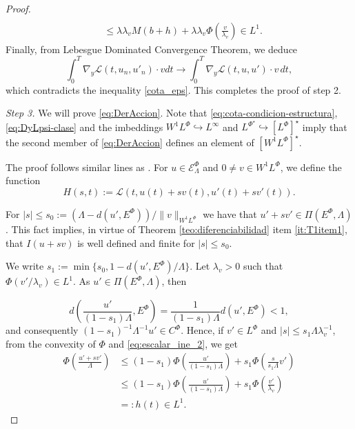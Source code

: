 \documentclass[twoside]{article}
\theoremstyle{remark}
\newcommand{\lphi}{L^{\Phi}}
\newcommand{\lpsi}{L^{\Phi^{\star}}}
\newcommand{\ephi}{E^{\Phi}}
\newcommand{\wphi}{W^{1}\lphi}
\newcommand{\sobnor}{\|_{W^{1}\lphi}}
\newcommand{\domi}{\mathcal{E}^{\Phi}}
\renewcommand{\leq}{\leqslant}
\begin{document}
\begin{proof}
\begin{equation}
\begin{split}
\\
&\leq \lambda\lambda_v M (b+h)+\lambda\lambda_v  \Phi\left(\frac{v}{\lambda_v}\right)\in L^1.
\end{split}
\end{equation}
  Finally, from  Lebesgue Dominated Convergence Theorem, we deduce
\begin{equation}\label{conv_debil}
\int_0^T  \nabla_y\mathcal{L}(t,u_{n},u'_{n})
\cdot  v dt
\to 
\int_0^T \nabla_y\mathcal{L}(t,u,u')\cdot v\, dt, \end{equation}
which contradicts the inequality \eqref{cota_eps}. This completes the proof of step 2.

\emph{Step 3.} We will prove \eqref{eq:DerAccion}. 
 Note that \eqref{eq:cota-condicion-estructura},  \eqref{eq:DyLpsi-clase} and the imbeddings $\wphi \hookrightarrow L^{\infty}$ and  
$\lpsi\hookrightarrow  \left[\lphi\right]^{\star}$ imply that the second member of
\eqref{eq:DerAccion} defines an element of $\left[\wphi\right]^{\star}$.

The proof follows similar lines as \cite[Thm. 1.4]{mawhin2010critical}. 
For $u\in \domi_{\Lambda}$ and $0\neq v\in\wphi$, we define the function
\[H(s,t):=\mathcal{L}(t,u(t)+s v(t),u'(t)+sv'(t)).\]



For  $|s|\leq s_0:=\left(\Lambda-d(u',\ephi)\right)/\|v\sobnor$  we have that  $u'+sv' \in \Pi(\ephi,\Lambda)$. 
This fact implies, in virtue of Theorem \ref{teo:diferenciabilidad} item \ref{it:T1item1}, 
that $I(u+s v)$ is well defined and finite for $|s|\leq s_0$. 



We write $s_1:=\min\{s_0,1-d(u',\ephi)/\Lambda\}$. Let $\lambda_v>0$ such that $\Phi(v'/\lambda_v)\in L^1$. As $u'\in\Pi(\ephi,\Lambda)$, then

\[
d\left(\frac{u'}{(1-s_1)\Lambda},E^{\Phi}\right)=\frac{1}{(1-s_1)\Lambda}d(u', E^{\Phi})<1,
\]
and consequently  $(1-s_1)^{-1}\Lambda^{-1}u'\in C^\Phi$. Hence,  if $v'\in\lphi$ and $|s|\leq s_1 \Lambda\lambda_v^{-1}$, from the convexity of $\Phi$ and \ref{eq:escalar_ine_2}, we get
\begin{equation}\label{eq:cota-u+sv}
\begin{split}
\Phi\left(\frac{u'+sv'}{\Lambda}\right)&
\leq
(1-s_1)\Phi\left(\frac{u'}{(1-s_1)\Lambda}\right)+s_1 \Phi\left(\frac{s}{s_1\Lambda}v'\right)
\\
&\leq
(1-s_1)\Phi\left(\frac{u'}{(1-s_1)\Lambda}\right)+s_1 \Phi\left(\frac{v'}{\lambda_v}\right)\\
&=:h(t) \in L^1.
\end{split}
\end{equation}




\end{proof}
\end{document}
